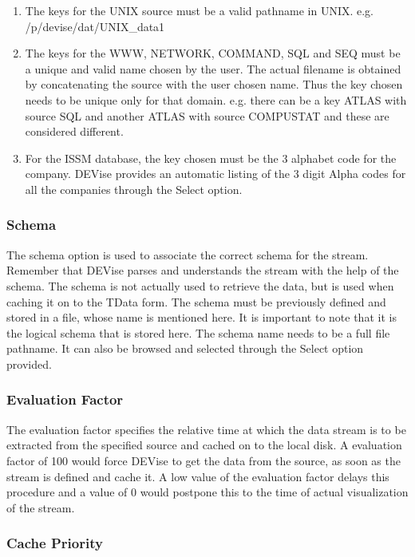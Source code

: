 \begin{enumerate}
\item
The keys for the UNIX source must be a valid pathname in UNIX.
e.g. /p/devise/dat/UNIX\_data1

\item
The keys for the WWW, NETWORK, COMMAND, SQL and SEQ must be a unique
and valid name chosen by the user. The actual filename is obtained by
concatenating the source with the user chosen name. Thus the key
chosen needs to be unique only for that domain. e.g. there can be a
key ATLAS with source SQL and another ATLAS with source COMPUSTAT and
these are considered different.

\item
For the ISSM database, the key chosen must be the 3 alphabet code for
the company. DEVise provides an automatic listing of the 3 digit Alpha
codes for all the companies through the Select option.
\end{enumerate}

\subsubsection{Schema}

The schema option is used to associate the correct schema for the
stream. Remember that DEVise parses and understands the stream with
the help of the schema. The schema is not actually used to retrieve
the data, but is used when caching it on to the TData form. The schema
must be previously defined and stored in a file, whose name is
mentioned here. It is important to note that it is the logical schema
that is stored here. The schema name needs to be a full file
pathname. It can also be browsed and selected through the Select
option provided.

\subsubsection{Evaluation Factor}

The evaluation factor specifies the relative time at which the data
stream is to be extracted from the specified source and cached on to
the local disk. A evaluation factor of 100 would force DEVise to get
the data from the source, as soon as the stream is defined and cache
it. A low value of the evaluation factor delays this procedure and a
value of 0 would postpone this to the time of actual visualization of
the stream.

\subsubsection{Cache Priority}

